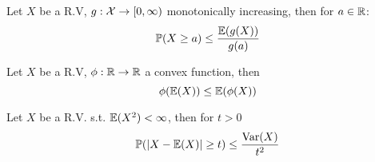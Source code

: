 \begin{theorem*}
  Let \(X\) be a R.V, \(g: \operatorname{\mathcal{X}} \to [0, \infty)\) monotonically increasing, then for \(a \in \mathbb{R}\):
  \[\mathbb{P}(X \geq a) \leq \frac{\mathbb{E}(g(X))}{g(a)}\]
\end{theorem*}

\begin{theorem*}
  Let \(X\) be a R.V, \(\phi: \mathbb{R} \to \mathbb{R}\) a convex function, then
  \[\phi(\mathbb{E}(X)) \leq \mathbb{E}(\phi(X))\]
\end{theorem*}

\begin{theorem*}
  Let \(X\) be a R.V. s.t. \(\mathbb{E}(X^2) < \infty\), then for \(t > 0\)
  \[\mathbb{P}(|X - \mathbb{E}(X)| \geq t) \leq \frac{\operatorname{Var}(X)}{t^2}\]
\end{theorem*}
